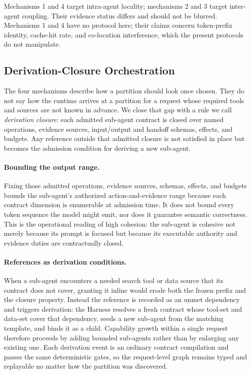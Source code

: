 \documentclass[11pt]{article}
\begin{document}
Mechanisms 1 and 4 target intra-agent locality; mechanisms 2 and 3 target inter-agent coupling. Their evidence status differs and should not be blurred. Mechanisms 1 and 4 have no protocol here; their claims concern token-prefix identity, cache-hit rate, and co-location interference, which the present protocols do not manipulate.

\subsection{Derivation-Closure Orchestration}
\label{sec:derivation-closure}

The four mechanisms describe how a partition should look once chosen. They do not say how the runtime arrives at a partition for a request whose required tools and sources are not known in advance. We close that gap with a rule we call \textit{derivation closure}: each admitted sub-agent contract is closed over named operations, evidence sources, input/output and handoff schemas, effects, and budgets. Any reference outside that admitted closure is not satisfied in place but becomes the admission condition for deriving a new sub-agent.

\paragraph{Bounding the output range.}
Fixing those admitted operations, evidence sources, schemas, effects, and budgets bounds the sub-agent's authorized action-and-evidence range because each contract dimension is enumerable at admission time. It does not bound every token sequence the model might emit, nor does it guarantee semantic correctness. This is the operational reading of high cohesion: the sub-agent is cohesive not merely because its prompt is focused but because its executable authority and evidence duties are contractually closed.

\paragraph{References as derivation conditions.}
When a sub-agent encounters a needed search tool or data source that its contract does not cover, granting it inline would erode both the frozen prefix and the closure property. Instead the reference is recorded as an unmet dependency and triggers derivation: the Harness resolves a fresh contract whose tool-set and data-set cover that dependency, seeds a new sub-agent from the matching template, and binds it as a child. Capability growth within a single request therefore proceeds by adding bounded sub-agents rather than by enlarging any existing one. Each derivation event is an ordinary contract compilation and passes the same deterministic gates, so the request-level graph remains typed and replayable no matter how the partition was discovered.
\end{document}

